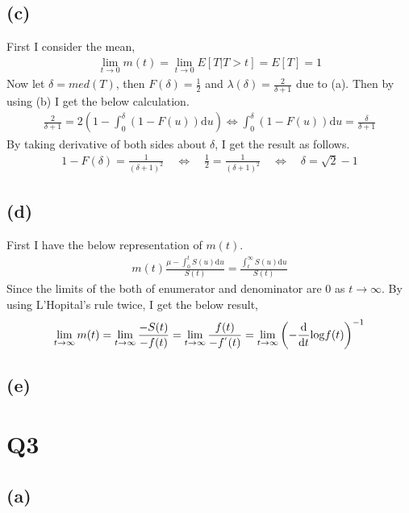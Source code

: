 \documentclass{article}
\begin{document}
\subsection{(c)}
First I consider the mean,
\begin{align*}
	\lim_{t \to 0} m(t) = \lim_{t \to 0} E[T | T > t] = E[T] = 1
\end{align*}
Now let $\delta = med(T)$, then $F(\delta) = \frac{1}{2}$ and $\lambda(\delta) = \frac{2}{\delta + 1}$ due to (a). Then by using (b) I get the below calculation.
\begin{align*}
	\frac{2}{\delta + 1} = 2 \left( 1 - \int_0^{\delta} (1 - F(u))\mathrm{d}u \right)
	\Leftrightarrow \int_0^{\delta} (1 - F(u)) \mathrm{d}u = \frac{\delta}{\delta + 1}
\end{align*}
By taking derivative of both sides about $\delta$, I get the result as follows.
\begin{align*}
	1 - F(\delta) = \frac{1}{(\delta+1)^2} \quad \Leftrightarrow \quad \frac{1}{2} = \frac{1}{(\delta+1)^2} \quad \Leftrightarrow \quad \delta = \sqrt{2} -1
\end{align*}

\subsection{(d)}
First I have the below representation of $m(t)$.
\begin{align*}
	m(t) \frac{\mu - \int_0^t S(u) \mathrm{d}u}{S(t)} = \frac{\int_t^{\infty} S(u) \mathrm{d}u}{S(t)}
\end{align*}
Since the limits of the both of enumerator and denominator are 0 as $t \to \infty$. By using L'Hopital's rule twice, I get the below result,
\begin{align*}
	\lim_{t \to \infty} m(t) = \lim_{t \to \infty} \frac{-S(t)}{-f(t)} = \lim_{t \to \infty} \frac{f(t)}{-f^{'}(t)} = \lim_{t \to \infty} \left( -\frac{\mathrm{d}}{\mathrm{d}t} {\rm log} f(t) \right)^{-1}
\end{align*}

\subsection{(e)}


\section{Q3}
\subsection{(a)}
\end{document}

